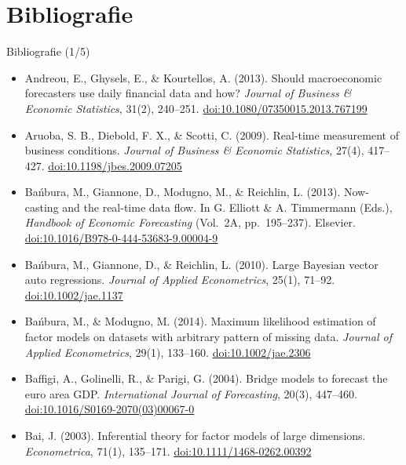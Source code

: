 \section{Bibliografie}

\begin{frame}{Bibliografie (1/5)}
\itemsize{\tiny}
\begin{itemize}
    \item Andreou, E., Ghysels, E., \& Kourtellos, A. (2013). Should macroeconomic forecasters use daily financial data and how? \textit{Journal of Business \& Economic Statistics}, 31(2), 240--251. \href{https://doi.org/10.1080/07350015.2013.767199}{doi:10.1080/07350015.2013.767199}
    \item Aruoba, S. B., Diebold, F. X., \& Scotti, C. (2009). Real-time measurement of business conditions. \textit{Journal of Business \& Economic Statistics}, 27(4), 417--427. \href{https://doi.org/10.1198/jbes.2009.07205}{doi:10.1198/jbes.2009.07205}
    \item Bańbura, M., Giannone, D., Modugno, M., \& Reichlin, L. (2013). Now-casting and the real-time data flow. In G. Elliott \& A. Timmermann (Eds.), \textit{Handbook of Economic Forecasting} (Vol.\ 2A, pp.\ 195--237). Elsevier. \href{https://doi.org/10.1016/B978-0-444-53683-9.00004-9}{doi:10.1016/B978-0-444-53683-9.00004-9}
    \item Bańbura, M., Giannone, D., \& Reichlin, L. (2010). Large Bayesian vector auto regressions. \textit{Journal of Applied Econometrics}, 25(1), 71--92. \href{https://doi.org/10.1002/jae.1137}{doi:10.1002/jae.1137}
    \item Bańbura, M., \& Modugno, M. (2014). Maximum likelihood estimation of factor models on datasets with arbitrary pattern of missing data. \textit{Journal of Applied Econometrics}, 29(1), 133--160. \href{https://doi.org/10.1002/jae.2306}{doi:10.1002/jae.2306}
    \item Baffigi, A., Golinelli, R., \& Parigi, G. (2004). Bridge models to forecast the euro area GDP. \textit{International Journal of Forecasting}, 20(3), 447--460. \href{https://doi.org/10.1016/S0169-2070(03)00067-0}{doi:10.1016/S0169-2070(03)00067-0}
    \item Bai, J. (2003). Inferential theory for factor models of large dimensions. \textit{Econometrica}, 71(1), 135--171. \href{https://doi.org/10.1111/1468-0262.00392}{doi:10.1111/1468-0262.00392}

\end{itemize}
\end{frame}
